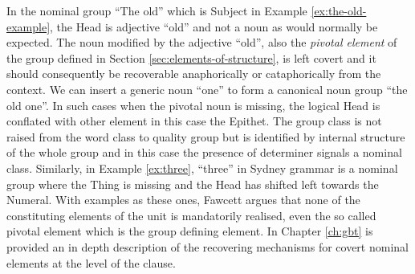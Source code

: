 In the nominal group ``The old'' which is Subject in Example \ref{ex:the-old-example}, the Head is adjective ``old'' and not a noun as would normally be expected. The noun modified by the adjective ``old'', also the \textit{pivotal element} of the group defined in Section \ref{sec:elements-of-structure}, is left covert and it should consequently be recoverable anaphorically or cataphorically from the context. We can insert a generic noun ``one'' to form a canonical noun group ``the old one''. In such cases when the pivotal noun is missing, the logical Head is conflated with other element in this case the Epithet. The group class is not raised from the word class to quality group but is identified by internal structure  of the whole group and in this case the presence of determiner signals a nominal class. Similarly, in Example \ref{ex:three}, ``three'' in Sydney grammar is a nominal group where the Thing is missing and the Head has shifted left towards the Numeral. With examples as these ones, Fawcett argues that none of the constituting elements of the unit is mandatorily realised, even the so called pivotal element which is the group defining element. In Chapter \ref{ch:gbt} is provided an in depth description of the recovering mechanisms for covert nominal elements at the level of the clause.

 

